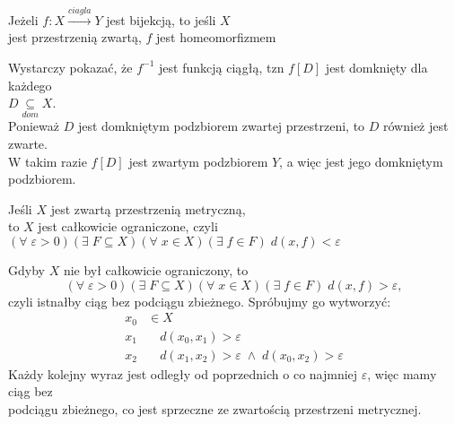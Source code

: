 \begin{center}\large
    Jeżeli $f:X\xrightarrow{ciagla} Y$ jest bijekcją, to jeśli $X$ \\jest przestrzenią zwartą, {\color{def}$f$ jest homeomorfizmem}
\end{center}
\dowod
Wystarczy pokazać, że $f^{-1}$ jest funkcją ciągłą, tzn $f[D]$ jest domknięty dla każdego \\$D\underset{dom}\subseteq X$. \medskip\\
Ponieważ $D$ jest domkniętym podzbiorem zwartej przestrzeni, to $D$ również jest zwarte. \\W takim razie $f[D]$ jest zwartym podzbiorem $Y$, a więc jest jego domkniętym podzbiorem.
\kondow
\begin{center}\large
    Jeśli $X$ jest zwartą przestrzenią metryczną, \\to {\color{def}$X$ jest całkowicie ograniczone}, czyli\smallskip\\
    $(\forall\;\varepsilon>0)(\exists\;F\subseteq X)(\forall\;x\in X)(\exists\;f\in F)\;d(x, f)<\varepsilon$
\end{center}
\dowod
Gdyby $X$ nie był całkowicie ograniczony, to
$$(\forall\;\varepsilon>0)(\exists\;F\subseteq X)(\forall\;x\in X)(\exists\;f\in F)\;d(x, f)>\varepsilon,$$
czyli istnałby ciąg bez podciągu zbieżnego. Spróbujmy go wytworzyć:
\begin{align*}
    x_0&\in X\\
    x_1&\quad d(x_0, x_1)>\varepsilon\\
    x_2&\quad d(x_1, x_2)>\varepsilon\;\land\;d(x_0, x_2)>\varepsilon
\end{align*}
Każdy kolejny wyraz jest odległy od poprzednich o co najmniej $\varepsilon$, więc mamy ciąg bez \\podciągu zbieżnego, co jest sprzeczne ze zwartością przestrzeni metrycznej.
\kondow